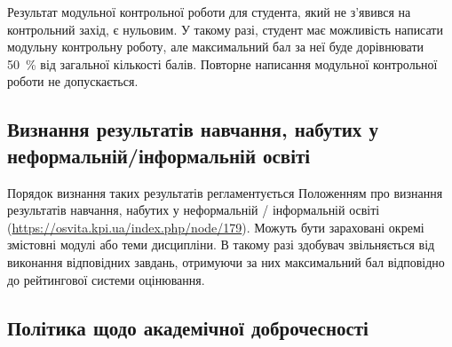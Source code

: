 \documentclass{Syllabus}
\begin{document}
Результат модульної контрольної роботи для студента, який не з’явився на контрольний захід, є нульовим. У такому разі, студент має можливість написати модульну контрольну роботу, але максимальний бал за неї буде дорівнювати 50~\% від загальної кількості балів. Повторне написання модульної контрольної роботи не допускається.




\subsection*{Визнання  результатів  навчання,  набутих  у  неформальній/інформальній освіті}

Порядок визнання таких результатів регламентується Положенням про визнання результатів навчання, набутих у неформальній / інформальній освіті (\url{https://osvita.kpi.ua/index.php/node/179}).  Можуть бути зараховані окремі змістовні модулі або теми дисципліни. В такому разі здобувач звільняється від виконання відповідних завдань, отримуючи за них максимальний бал відповідно до рейтингової системи оцінювання.


\subsection*{Політика щодо академічної доброчесності}
\end{document}
